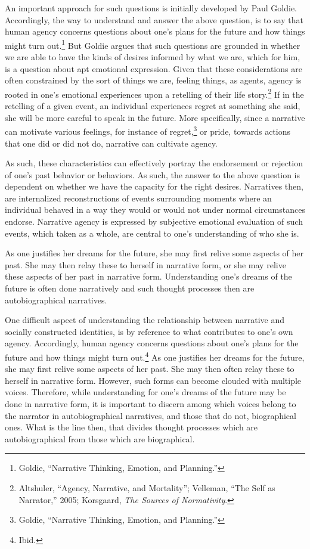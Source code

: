 \documentclass[phdthesis,12pt,final]{wuthesis}
\theoremstyle{definition}
\theoremstyle{definition}
\theoremstyle{definition}
\theoremstyle{definition}
\theoremstyle{remark}
\begin{document}
An important approach for such questions is initially developed by Paul Goldie. Accordingly, the way to understand and answer the above question, is to say that human agency concerns questions about one's plans for the future and how things might turn out.\footnote{Goldie, {``Narrative {Thinking}, {Emotion}, and {Planning}.''}} But Goldie argues that such questions are grounded in whether we are able to have the kinds of desires informed by what we are, which for him, is a question about apt emotional expression. Given that these considerations are often constrained by the sort of things we are, feeling things, as agents, agency is rooted in one's emotional experiences upon a retelling of their life story.\footnote{Altshuler, {``Agency, Narrative, and Mortality''}; Velleman, {``The {Self} as {Narrator},''} 2005; Korsgaard, \emph{The Sources of Normativity}.} If in the retelling of a given event, an individual experiences regret at something she said, she will be more careful to speak in the future. More specifically, since a narrative can motivate various feelings, for instance of regret,\footnote{Goldie, {``Narrative {Thinking}, {Emotion}, and {Planning}.''}} or pride, towards actions that one did or did not do, narrative can cultivate agency.

As such, these characteristics can effectively portray the endorsement or rejection of one's past behavior or behaviors. As such, the answer to the above question is dependent on whether we have the capacity for the right desires. Narratives then, are internalized reconstructions of events surrounding moments where an individual behaved in a way they would or would not under normal circumstances endorse. Narrative agency is expressed by subjective emotional evaluation of such events, which taken as a whole, are central to one's understanding of who she is.

As one justifies her dreams for the future, she may first relive some aspects of her past. She may then relay these to herself in narrative form, or she may relive these aspects of her past in narrative form. Understanding one's dreams of the future is often done narratively and such thought processes then are autobiographical narratives.

One difficult aspect of understanding the relationship between narrative and socially constructed identities, is by reference to what contributes to one's own agency. Accordingly, human agency concerns questions about one's plans for the future and how things might turn out.\footnote{Ibid.} As one justifies her dreams for the future, she may first relive some aspects of her past. She may then often relay these to herself in narrative form. However, such forms can become clouded with multiple voices. Therefore, while understanding for one's dreams of the future may be done in narrative form, it is important to discern among which voices belong to the narrator in autobiographical narratives, and those that do not, biographical ones. What is the line then, that divides thought processes which are autobiographical from those which are biographical.
\end{document}
